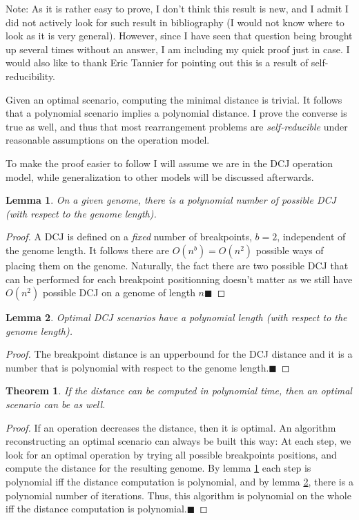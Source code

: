 \documentclass[11pt,final,twoside,nofrench]{thlifl}
\newcommand{\qed}{\ensuremath{\blacksquare}}
\newtheorem{proof}{Proof}
\newtheorem{theorem}{Theorem}
\newtheorem{lemma}{Lemma}
\begin{document}
Note: As it is rather easy to prove, I don't think this result is new, and I admit I did not actively look for such result in bibliography (I would not know where to look as it is very general). However, since I have seen that question being brought up several times without an answer, I am including my quick proof just in case. I would also like to thank Eric Tannier for pointing out this is a result of self-reducibility.

Given an optimal scenario, computing the minimal distance is trivial. It follows that a polynomial scenario implies a polynomial distance. I prove the converse is true as well, and thus that most rearrangement problems are \emph{self-reducible} under reasonable assumptions on the operation model.

To make the proof easier to follow I will assume we are in the DCJ operation model, while generalization to other models will be discussed afterwards.

\begin{lemma}
\label{lem:possibleop}
On a given genome, there is a polynomial number of possible DCJ (with respect to the genome length).
\end{lemma}

\begin{proof}
A DCJ is defined on a \emph{fixed} number of breakpoints, $b=2$, independent of the genome length. It follows there are $O(n^b) = O(n^2)$ possible ways of placing them on the genome. Naturally, the fact there are two possible DCJ that can be performed for each breakpoint positionning doesn't matter as we still have $O(n^2)$ possible DCJ on a genome of length $n$\qed
\end{proof}

\begin{lemma}
\label{lem:polydist}
Optimal DCJ scenarios have a polynomial length (with respect to the genome length).
\end{lemma}

\begin{proof}
The breakpoint distance is an upperbound for the DCJ distance and it is a number that is polynomial with respect to the genome length.\qed
\end{proof}

\begin{theorem}
If the distance can be computed in polynomial time, then an optimal scenario can be as well.
\end{theorem}

\begin{proof}
If an operation decreases the distance, then it is optimal. An algorithm reconstructing an optimal scenario can always be built this way: At each step, we look for an optimal operation by trying all possible breakpoints positions, and compute the distance for the resulting genome. By lemma \ref{lem:possibleop} each step is polynomial iff the distance computation is polynomial, and by lemma \ref{lem:polydist}, there is a polynomial number of iterations. Thus, this algorithm is polynomial on the whole iff the distance computation is polynomial.\qed
\end{proof}
\end{document}
